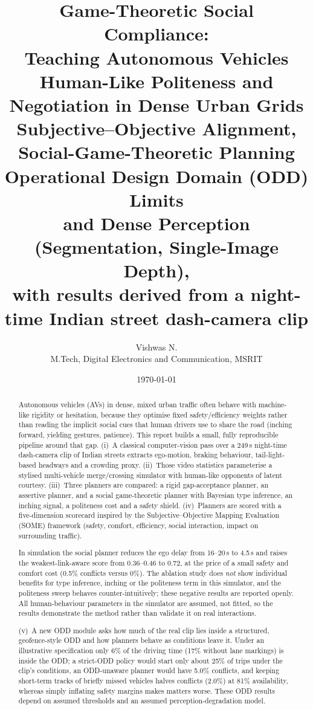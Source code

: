 \documentclass[11pt,a4paper]{article}
\title{\textbf{Game-Theoretic Social Compliance:\\ Teaching Autonomous Vehicles Human-Like Politeness and\\ Negotiation in Dense Urban Grids}\\[4pt]
\large Subjective--Objective Alignment, Social-Game-Theoretic Planning\\ Operational Design Domain (ODD) Limits\\ and Dense Perception (Segmentation, Single-Image Depth),\\ with results derived from a night-time Indian street dash-camera clip}
\author{Vishwas N.\\ M.Tech, Digital Electronics and Communication, MSRIT}
\date{\today}
\begin{document}
\maketitle

\begin{abstract}
Autonomous vehicles (AVs) in dense, mixed urban traffic often behave with machine-like rigidity or hesitation, because they optimise fixed safety/efficiency weights rather than reading the implicit social cues that human drivers use to share the road (inching forward, yielding gestures, patience). This report builds a small, fully reproducible pipeline around that gap. (i)~A classical computer-vision pass over a 249\,s night-time dash-camera clip of Indian streets extracts ego-motion, braking behaviour, tail-light-based headways and a crowding proxy. (ii)~Those video statistics parameterise a stylised multi-vehicle merge/crossing simulator with human-like opponents of latent courtesy. (iii)~Three planners are compared: a rigid gap-acceptance planner, an assertive planner, and a social game-theoretic planner with Bayesian type inference, an inching signal, a politeness cost and a safety shield. (iv)~Planners are scored with a five-dimension scorecard inspired by the Subjective--Objective Mapping Evaluation (SOME) framework (safety, comfort, efficiency, social interaction, impact on surrounding traffic).

In simulation the social planner reduces the ego delay from 16--20\,s to 4.5\,s and raises the weakest-link-aware score from 0.36--0.46 to 0.72, at the price of a small safety and comfort cost (0.5\% conflicts versus 0\%). The ablation study does \emph{not} show individual benefits for type inference, inching or the politeness term in this simulator, and the politeness sweep behaves counter-intuitively; these negative results are reported openly. All human-behaviour parameters in the simulator are assumed, not fitted, so the results demonstrate the method rather than validate it on real interactions.

(v)~A new ODD module asks how much of the real clip lies inside a structured, geofence-style ODD and how planners behave as conditions leave it. Under an illustrative specification only 6\% of the driving time (17\% without lane markings) is inside the ODD; a strict-ODD policy would start only about 25\% of trips under the clip's conditions, an ODD-unaware planner would have 5.0\% conflicts, and keeping short-term tracks of briefly missed vehicles halves conflicts (2.0\%) at 81\% availability, whereas simply inflating safety margins makes matters worse. These ODD results depend on assumed thresholds and an assumed perception-degradation model.


\end{abstract}
\end{document}
